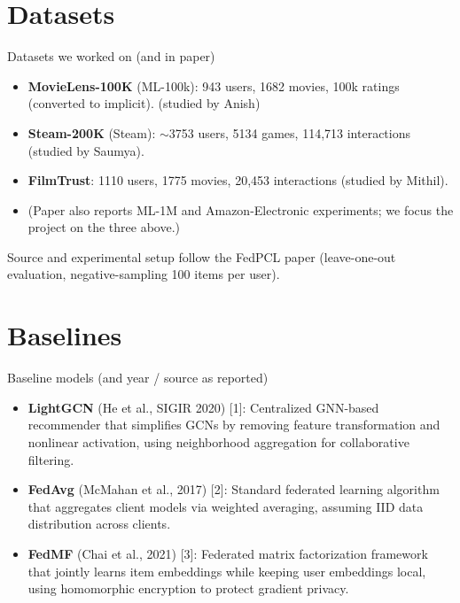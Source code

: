 \documentclass{beamer}
\begin{document}
\section{Datasets}
\begin{frame}{Datasets we worked on (and in paper)}
  \begin{itemize}
    \item \textbf{MovieLens-100K} (ML-100k): 943 users, 1682 movies, 100k ratings (converted to implicit). (studied by Anish)
    \item \textbf{Steam-200K} (Steam): $\sim$3753 users, 5134 games, 114,713 interactions (studied by Saumya).
    \item \textbf{FilmTrust}: 1110 users, 1775 movies, 20,453 interactions (studied by Mithil).
    \item (Paper also reports ML-1M and Amazon-Electronic experiments; we focus the project on the three above.)
  \end{itemize}
  Source and experimental setup follow the FedPCL paper (leave-one-out evaluation, negative-sampling 100 items per user).
\end{frame}

\section{Baselines}

\begin{frame}{Baseline models (and year / source as reported)}
\small
\begin{itemize}
  \item \textbf{LightGCN} (He et al., SIGIR 2020) [1]: Centralized GNN-based recommender that simplifies GCNs by removing feature transformation and nonlinear activation, using neighborhood aggregation for collaborative filtering.

  \item \textbf{FedAvg} (McMahan et al., 2017) [2]: Standard federated learning algorithm that aggregates client models via weighted averaging, assuming IID data distribution across clients.

  \item \textbf{FedMF} (Chai et al., 2021) [3]: Federated matrix factorization framework that jointly learns item embeddings while keeping user embeddings local, using homomorphic encryption to protect gradient privacy.
\end{itemize}
\end{frame}
\end{document}
